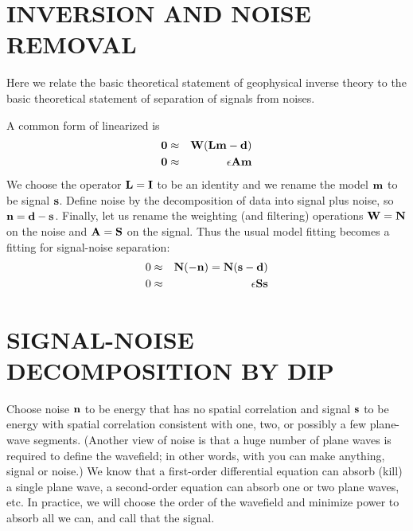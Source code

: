 \section{INVERSION AND NOISE REMOVAL}
Here we relate the basic theoretical statement
of geophysical inverse theory
to the basic theoretical statement
of separation of signals from noises.
\par
A common form of linearized  is
\begin{eqnarray}
\bold 0 & \approx & \bold W ( \bold L \bold m - \bold d)  \\
\bold 0 & \approx & \epsilon  \bold A \bold m
\end{eqnarray}
We choose the operator $\bold L = \bold I$ to be an identity
and we rename the model $\bold m$ to be signal $\bold s$.
Define noise by the decomposition of data into signal plus noise,
so
$\bold n = \bold d-\bold s$.
Finally, let us rename the weighting (and filtering) operations
$\bold W=\bold N$ on the noise and 
$\bold A=\bold S$ on the signal.
Thus the usual model fitting becomes
a fitting for signal-noise separation:
\begin{eqnarray}
\label{eqn:noisereg}
0 & \approx &          \bold N (-\bold n) = \bold N ( \bold s - \bold d)  \\
\label{eqn:signalreg}
0 & \approx & \epsilon \bold S   \bold s
\end{eqnarray}

\section{SIGNAL-NOISE DECOMPOSITION BY DIP}
Choose noise $\bold n$ to be energy that has no spatial correlation
and signal $\bold s$ to be energy with spatial correlation
consistent with one, two, or possibly a few plane-wave segments.
(Another view of noise is that a huge number of plane waves is required
to define the wavefield; in other words, with 
you can make anything, signal or noise.)
We know that a first-order differential equation can absorb (kill)
a single plane wave, a second-order equation
can absorb one or two plane waves, etc.
In practice, we will choose the order of the wavefield
and minimize power to absorb all we can,
and call that the signal.

